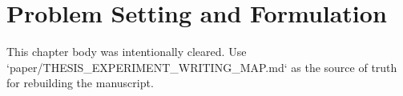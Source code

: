 \chapter{Problem Setting and Formulation}
\label{ch:problem}

This chapter body was intentionally cleared. Use `paper/THESIS_EXPERIMENT_WRITING_MAP.md` as the source of truth for rebuilding the manuscript.

